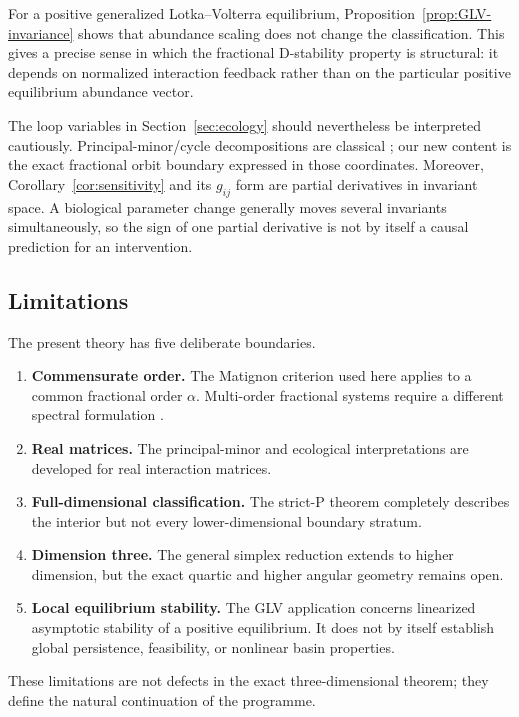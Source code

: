 For a positive generalized Lotka--Volterra equilibrium, Proposition~\ref{prop:GLV-invariance} shows that abundance scaling does not change the classification. This gives a precise sense in which the fractional D-stability property is structural: it depends on normalized interaction feedback rather than on the particular positive equilibrium abundance vector.

The loop variables in Section~\ref{sec:ecology} should nevertheless be interpreted cautiously. Principal-minor/cycle decompositions are classical \citep{Kinkhabwala2015}; our new content is the exact fractional orbit boundary expressed in those coordinates. Moreover, Corollary~\ref{cor:sensitivity} and its \(g_{ij}\) form are partial derivatives in invariant space. A biological parameter change generally moves several invariants simultaneously, so the sign of one partial derivative is not by itself a causal prediction for an intervention.

\subsection{Limitations}

The present theory has five deliberate boundaries.

\begin{enumerate}
\item \textbf{Commensurate order.}
The Matignon criterion used here applies to a common fractional order \(\alpha\). Multi-order fractional systems require a different spectral formulation \citep{BrandiburGarrappaKaslik2021}.

\item \textbf{Real matrices.}
The principal-minor and ecological interpretations are developed for real interaction matrices.

\item \textbf{Full-dimensional classification.}
The strict-P theorem completely describes the interior but not every lower-dimensional boundary stratum.

\item \textbf{Dimension three.}
The general simplex reduction extends to higher dimension, but the exact quartic and higher angular geometry remains open.

\item \textbf{Local equilibrium stability.}
The GLV application concerns linearized asymptotic stability of a positive equilibrium. It does not by itself establish global persistence, feasibility, or nonlinear basin properties.
\end{enumerate}

These limitations are not defects in the exact three-dimensional theorem; they define the natural continuation of the programme.
